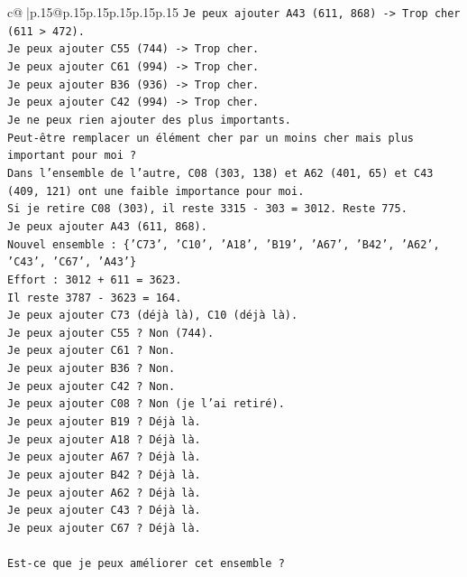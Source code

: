 \documentclass{article}
\begin{document}
{\begin{supertabular}{c@{$\;$}|p{.15\linewidth}@{}p{.15\linewidth}p{.15\linewidth}p{.15\linewidth}p{.15\linewidth}p{.15\linewidth}}
{{{\texttt{Je peux ajouter A43 (611, 868) {-}> Trop cher (611 > 472).} \\
\texttt{Je peux ajouter C55 (744) {-}> Trop cher.} \\
\texttt{Je peux ajouter C61 (994) {-}> Trop cher.} \\
\texttt{Je peux ajouter B36 (936) {-}> Trop cher.} \\
\texttt{Je peux ajouter C42 (994) {-}> Trop cher.} \\
\texttt{Je ne peux rien ajouter des plus importants.} \\
\texttt{Peut{-}être remplacer un élément cher par un moins cher mais plus important pour moi ?} \\
\texttt{Dans l'ensemble de l'autre, C08 (303, 138) et A62 (401, 65) et C43 (409, 121) ont une faible importance pour moi.} \\
\texttt{Si je retire C08 (303), il reste 3315 {-} 303 = 3012. Reste 775.} \\
\texttt{Je peux ajouter A43 (611, 868).} \\
\texttt{Nouvel ensemble : \{'C73', 'C10', 'A18', 'B19', 'A67', 'B42', 'A62', 'C43', 'C67', 'A43'\}} \\
\texttt{Effort : 3012 + 611 = 3623.} \\
\texttt{Il reste 3787 {-} 3623 = 164.} \\
\texttt{Je peux ajouter C73 (déjà là), C10 (déjà là).} \\
\texttt{Je peux ajouter C55 ? Non (744).} \\
\texttt{Je peux ajouter C61 ? Non.} \\
\texttt{Je peux ajouter B36 ? Non.} \\
\texttt{Je peux ajouter C42 ? Non.} \\
\texttt{Je peux ajouter C08 ? Non (je l'ai retiré).} \\
\texttt{Je peux ajouter B19 ? Déjà là.} \\
\texttt{Je peux ajouter A18 ? Déjà là.} \\
\texttt{Je peux ajouter A67 ? Déjà là.} \\
\texttt{Je peux ajouter B42 ? Déjà là.} \\
\texttt{Je peux ajouter A62 ? Déjà là.} \\
\texttt{Je peux ajouter C43 ? Déjà là.} \\
\texttt{Je peux ajouter C67 ? Déjà là.} \\
\\ 
\texttt{Est{-}ce que je peux améliorer cet ensemble ?} \\
}}}
\end{supertabular}}
\end{document}
